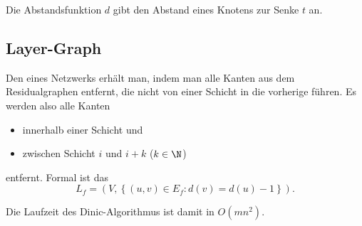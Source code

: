 Die Abstandsfunktion \( d \) gibt den Abstand eines Knotens zur Senke \( t \) an.

\subsection{Layer-Graph}

Den  eines Netzwerks erhält man, indem man alle Kanten aus dem Residualgraphen entfernt, die nicht von einer Schicht in die vorherige führen. Es werden also alle Kanten
\begin{itemize}
  \item innerhalb einer Schicht und
  \item zwischen Schicht \( i \) und \( i + k \) (\( k \in \N \))
\end{itemize}
entfernt. Formal ist das
\begin{equation*}
  L_f = (V, \left \{ (u,v) \in E_f : d(v) = d(u) - 1 \right \})\text{.}
\end{equation*}

Die Laufzeit des Dinic-Algorithmus ist damit in \( O(mn^2) \).